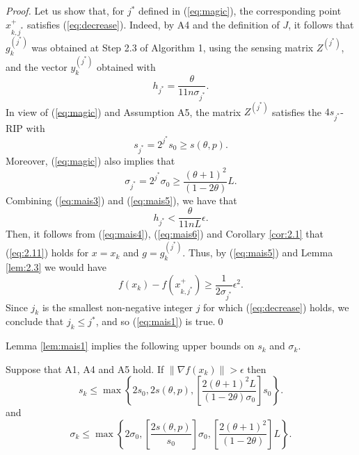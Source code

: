 \begin{proof}
Let us show that, for $j^{*}$ defined in (\ref{eq:magic}), the corresponding point $x_{k,j^{*}}^{+}$ satisfies (\ref{eq:decrease}). Indeed, by A4 and the definition of $J$, it follows that $g_{k}^{(j^{*})}$ was obtained at Step 2.3 of Algorithm 1, using the sensing matrix $Z^{(j^{*})}$, and the vector $y_{k}^{(j^{*})}$ obtained with
\begin{equation}
h_{j^{*}}=\dfrac{\theta}{11 n\sigma_{j^{*}}}.
 \label{eq:mais3}   
\end{equation}
In view of (\ref{eq:magic}) and Assumption A5, the matrix $Z^{(j^{*})}$ satisfies the $4s_{j^{*}}$-RIP with 
\begin{equation}
s_{j^{*}}=2^{j^{*}}s_{0}\geq s(\theta,p).
\label{eq:mais4}
\end{equation}
Moreover, (\ref{eq:magic}) also implies that 
\begin{equation}
\sigma_{j^{*}}=2^{j^{*}}\sigma_{0}\geq\dfrac{(\theta+1)^{2}}{(1-2\theta)}L.
\label{eq:mais5}
\end{equation}
Combining (\ref{eq:mais3}) and (\ref{eq:mais5}), we have that
\begin{equation}
h_{j^{*}}<\dfrac{\theta}{11 n L}\epsilon.
\label{eq:mais6}
\end{equation}
Then, it follows from (\ref{eq:mais4}), (\ref{eq:mais6}) and Corollary \ref{cor:2.1} that (\ref{eq:2.11}) holds for $x=x_{k}$ and $g=g_{k}^{(j^{*})}$. Thus, by (\ref{eq:mais5}) and Lemma \ref{lem:2.3} we would have 
\begin{equation*}
f(x_{k})-f(x_{k,j^{*}}^{+})\geq\dfrac{1}{2\sigma_{j^{*}}}\epsilon^{2}.
\end{equation*}
Since $j_{k}$ is the smallest non-negative integer $j$ for which (\ref{eq:decrease}) holds, we conclude that $j_{k}\leq j^{*}$, and so (\ref{eq:mais1}) is true.\qed
\end{proof}
Lemma \ref{lem:mais1} implies the following upper bounds on $s_{k}$ and $\sigma_{k}$.
\begin{lemma}
Suppose that A1, A4 and A5 hold. If $\|\nabla f(x_{k})\|>\epsilon$ then
\begin{equation*}
s_{k}\leq\max\left\{2s_{0},2s(\theta,p),\left[\dfrac{2(\theta+1)^{2}L}{(1-2\theta)\sigma_{0}}\right]s_{0}\right\}.
\end{equation*}
and
\begin{equation*}
\sigma_{k}\leq\max\left\{2\sigma_{0},\left[\dfrac{2 s(\theta,p)}{s_{0}}\right]\sigma_{0},\left[\dfrac{2(\theta+1)^{2}}{(1-2\theta)}\right]L\right\}.
\end{equation*}
\label{lem:mais2}
\end{lemma}

